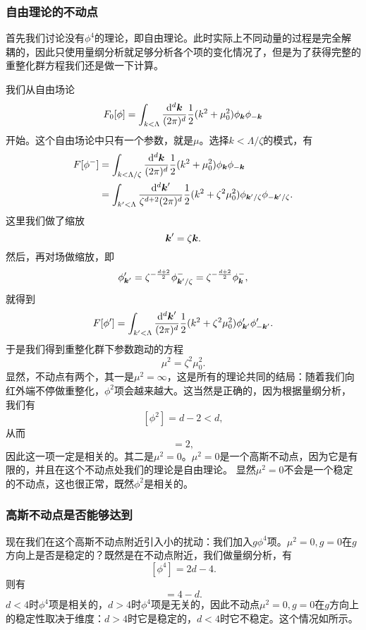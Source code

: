 \documentclass[hyperref, UTF8, a4paper]{ctexart}
\renewcommand{\autoref}{\prettyref}
\begin{document}
\subsubsection{自由理论的不动点}

首先我们讨论没有$\phi^4$的理论，即自由理论。此时实际上不同动量的过程是完全解耦的，因此只使用量纲分析就足够分析各个项的变化情况了，但是为了获得完整的重整化群方程我们还是做一下计算。

我们从自由场论
\[
    F_0[\phi] = \int_{k<\Lambda} \frac{\dd[d]{\vb*{k}}}{(2\pi)^d} \frac{1}{2} (k^2 + \mu_0^2) \phi_{\vb*{k}} \phi_{-\vb*{k}}
\]
开始。这个自由场论中只有一个参数，就是$\mu$。选择$k<\Lambda/\zeta$的模式，有
\[
    \begin{aligned}
        F[\phi^-] &= \int_{k < \Lambda / \zeta} \frac{\dd[d]{\vb*{k}}}{(2\pi)^d} \frac{1}{2} (k^2 + \mu_0^2) \phi_{\vb*{k}} \phi_{-\vb*{k}} \\
        &= \int_{k' < \Lambda} \frac{\dd[d]{\vb*{k}'}}{\zeta^{d+2} (2\pi)^d} \frac{1}{2} (k^2 + \zeta^2 \mu_0^2) \phi_{\vb*{k}'/\zeta} \phi_{-\vb*{k}'/\zeta}.
    \end{aligned}
\]
这里我们做了缩放
\[
    \vb*{k}' = \zeta \vb*{k}.
\]
然后，再对场做缩放，即
\[
    \phi'_{\vb*{k}'} = \zeta^{-\frac{d+2}{2}} \phi^-_{\vb*{k}'/\zeta} = \zeta^{-\frac{d+2}{2}} \phi^-_{\vb*{k}},
\]
就得到
\[
    F[\phi'] = \int_{k' < \Lambda} \frac{\dd[d]{\vb*{k}'}}{(2\pi)^d} \frac{1}{2} (k^2 + \zeta^2 \mu_0^2) \phi'_{\vb*{k}'} \phi'_{-\vb*{k}'}.
\]
于是我们得到重整化群下参数跑动的方程
\begin{equation}
    \mu^2 = \zeta^2 \mu_0^2.
\end{equation}
显然，不动点有两个，其一是$\mu^2=\infty$，这是所有的理论共同的结局：随着我们向红外端不停做重整化，$\phi^2$项会越来越大。这当然是正确的，因为根据量纲分析，我们有
\[
    [\phi^2] = d-2 < d,
\]
从而
\begin{equation}
    [\mu^2] = 2,
\end{equation}
因此这一项一定是相关的。其二是$\mu^2=0$。$\mu^2=0$是一个高斯不动点，因为它是有限的，并且在这个不动点处我们的理论是自由理论。
显然$\mu^2=0$不会是一个稳定的不动点，这也很正常，既然$\phi^2$是相关的。

\subsubsection{高斯不动点是否能够达到}\label{sec:can-we-hit-gaussian}

现在我们在这个高斯不动点附近引入小的扰动：我们加入$g \phi^4$项。$\mu^2=0, g=0$在$g$方向上是否是稳定的？既然是在不动点附近，我们做量纲分析，有
\[
    [\phi^4] = 2d-4.
\]
则有
\begin{equation}
    [g] = 4-d.
\end{equation}
$d<4$时$\phi^4$项是相关的，$d>4$时$\phi^4$项是无关的，因此不动点$\mu^2=0, g=0$在$g$方向上的稳定性取决于维度：$d>4$时它是稳定的，$d<4$时它不稳定。这个情况如\autoref{fig:gaussian-stable}所示。
\end{document}
